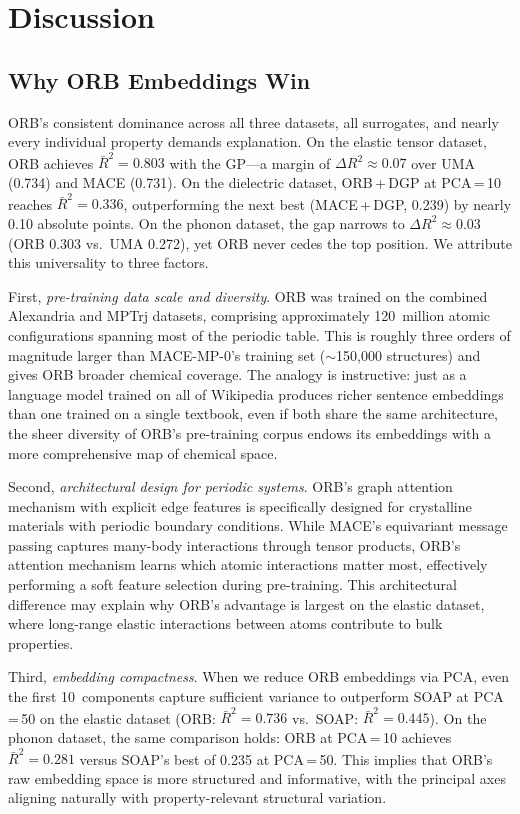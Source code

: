 \section{Discussion}
\label{sec:discussion}

\subsection{Why ORB Embeddings Win}
\label{sec:why_orb}

ORB's consistent dominance across all three datasets, all surrogates, and nearly every individual property demands explanation.
On the elastic tensor dataset, ORB achieves $\bar{R}^2 = 0.803$ with the GP---a margin of $\Delta R^2 \approx 0.07$ over UMA (0.734) and MACE (0.731).
On the dielectric dataset, ORB\,+\,DGP at PCA\,=\,10 reaches $\bar{R}^2 = 0.336$, outperforming the next best (MACE\,+\,DGP, 0.239) by nearly 0.10 absolute points.
On the phonon dataset, the gap narrows to $\Delta R^2 \approx 0.03$ (ORB 0.303 vs.\ UMA 0.272), yet ORB never cedes the top position.
We attribute this universality to three factors.

First, \emph{pre-training data scale and diversity}.
ORB was trained on the combined Alexandria and MPTrj datasets, comprising approximately 120~million atomic configurations spanning most of the periodic table.
This is roughly three orders of magnitude larger than MACE-MP-0's training set ($\sim$150{,}000 structures) and gives ORB broader chemical coverage.
The analogy is instructive: just as a language model trained on all of Wikipedia produces richer sentence embeddings than one trained on a single textbook, even if both share the same architecture, the sheer diversity of ORB's pre-training corpus endows its embeddings with a more comprehensive map of chemical space.

Second, \emph{architectural design for periodic systems}.
ORB's graph attention mechanism with explicit edge features is specifically designed for crystalline materials with periodic boundary conditions.
While MACE's equivariant message passing captures many-body interactions through tensor products, ORB's attention mechanism learns which atomic interactions matter most, effectively performing a soft feature selection during pre-training.
This architectural difference may explain why ORB's advantage is largest on the elastic dataset, where long-range elastic interactions between atoms contribute to bulk properties.

Third, \emph{embedding compactness}.
When we reduce ORB embeddings via PCA, even the first 10~components capture sufficient variance to outperform SOAP at PCA\,=\,50 on the elastic dataset (ORB: $\bar{R}^2 = 0.736$ vs.\ SOAP: $\bar{R}^2 = 0.445$).
On the phonon dataset, the same comparison holds: ORB at PCA\,=\,10 achieves $\bar{R}^2 = 0.281$ versus SOAP's best of 0.235 at PCA\,=\,50.
This implies that ORB's raw embedding space is more structured and informative, with the principal axes aligning naturally with property-relevant structural variation.

